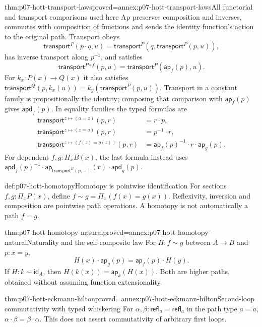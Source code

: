 \begin{hbtheorem}{thm:p07-hott-transport-laws}{proved=annex:p07-hott-transport-laws}{All functorial and transport comparisons used here}
Ap preserves composition and inverses, commutes with composition of
functions and sends the identity function's action to the original path.
Transport obeys
\[
 \mathsf{transport}^{P}(p\cdot q,u)
 =\mathsf{transport}^{P}(q,\mathsf{transport}^{P}(p,u)),
\]
has inverse transport along $p^{-1}$, and satisfies
\[
 \mathsf{transport}^{P\circ f}(p,u)
 =\mathsf{transport}^{P}(\mathsf{ap}_f(p),u).
\]
For $k_x:P(x)\to Q(x)$ it also satisfies
$\mathsf{transport}^{Q}(p,k_x(u))=k_y(\mathsf{transport}^{P}(p,u))$.
Transport in a constant family is propositionally the identity; composing
that comparison with $\mathsf{ap}_f(p)$ gives $\mathsf{apd}_f(p)$.
In equality families the typed formulas are
\[
 \begin{aligned}
 \mathsf{transport}^{z\mapsto(a=z)}(p,r)&=r\cdot p,\\
 \mathsf{transport}^{z\mapsto(z=a)}(p,r)&=p^{-1}\cdot r,\\
 \mathsf{transport}^{z\mapsto(f(z)=g(z))}(p,r)
   &=\mathsf{ap}_f(p)^{-1}\cdot r\cdot\mathsf{ap}_g(p).
 \end{aligned}
\]
For dependent $f,g:\Pi_x B(x)$, the last formula instead uses
$\mathsf{apd}_f(p)^{-1}\cdot
\mathsf{ap}_{\mathsf{transport}^{B}(p,-)}(r)\cdot\mathsf{apd}_g(p)$.
\end{hbtheorem}

\begin{hbdefinition}{def:p07-hott-homotopy}{Homotopy is pointwise identification}
For sections $f,g:\Pi_xP(x)$, define
$f\sim g=\Pi_x(f(x)=g(x))$. Reflexivity, inversion and composition are
pointwise path operations. A homotopy is not automatically a path $f=g$.
\end{hbdefinition}

\begin{hbtheorem}{thm:p07-hott-homotopy-natural}{proved=annex:p07-hott-homotopy-natural}{Naturality and the self-composite law}
For $H:f\sim g$ between $A\to B$ and $p:x=y$,
\[
 H(x)\cdot\mathsf{ap}_g(p)=\mathsf{ap}_f(p)\cdot H(y).
\]
If $H:k\sim\mathsf{id}_A$, then
$H(k(x))=\mathsf{ap}_k(H(x))$. Both are higher paths, obtained without
assuming function extensionality.
\end{hbtheorem}

\begin{hbtheorem}{thm:p07-hott-eckmann-hilton}{proved=annex:p07-hott-eckmann-hilton}{Second-loop commutativity with typed whiskering}
For $\alpha,\beta:\mathsf{refl}_a=\mathsf{refl}_a$ in the path type
$a=a$, $\alpha\cdot\beta=\beta\cdot\alpha$.
This does not assert commutativity of arbitrary first loops.
\end{hbtheorem}

